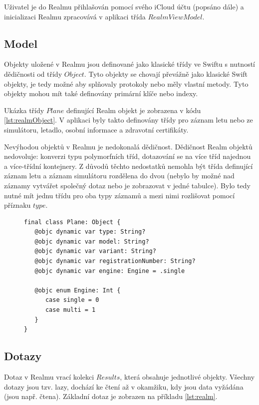 \documentclass[thesis=M,czech]{FITthesis}[2012/06/26]
\begin{document}
Uživatel je do Realmu přihlašován pomocí svého iCloud účtu (popsáno dále) a inicializaci Realmu zpracovává v aplikaci třída $RealmViewModel$.
	
\subsection{Model}
Objekty uložené v Realmu jsou definované jako klasické třídy ve Swiftu s nutností dědičnosti od třídy $Object$. Tyto objekty se chovají převážně jako klasické Swift objekty, je tedy možné aby splňovaly protokoly nebo měly vlastní metody. Tyto objekty mohou mít také definovány primární klíče nebo indexy. 

Ukázka třídy $Plane$ definující Realm objekt je zobrazena v kódu \ref{lst:realmObject}. V aplikaci byly takto definovány třídy pro záznam letu nebo ze simulátoru, letadlo, osobní informace a zdravotní certifikáty.

Nevýhodou objektů v Realmu je nedokonalá dědičnost. Dědičnost Realm objektů nedovoluje: konverzi typu polymorfních tříd, dotazování se na více tříd najednou a více-třídní kontejnery. \cite{realmDocs} Z důvodů těchto nedostatků nemohla být třída definující záznam letu a záznam simulátoru rozdělena do dvou (nebylo by možné nad záznamy vytvářet společný dotaz nebo je zobrazovat v jedné tabulce). Bylo tedy nutné mít jednu třídu pro oba typy záznamů a mezi nimi rozlišovat pomocí příznaku $type$.

\begin{figure}
\begin{minipage}{\linewidth}
\begin{lstlisting}[caption={Ukázka modelu Plane},label={lst:realmObject}]
final class Plane: Object {
   @objc dynamic var type: String?
   @objc dynamic var model: String?
   @objc dynamic var variant: String?
   @objc dynamic var registrationNumber: String?
   @objc dynamic var engine: Engine = .single
    
   @objc enum Engine: Int {
      case single = 0
      case multi = 1
   }
}
\end{lstlisting}
\end{minipage}
\end{figure}

\subsection{Dotazy}
Dotaz v Realmu vrací kolekci $Results$, která obsahuje jednotlivé objekty. Všechny dotazy jsou tzv. lazy, dochází ke čtení až v okamžiku, kdy jsou data vyžádána (jsou např. čtena). \cite{realmDocs} Základní dotaz je zobrazen na příkladu \ref{lst:realm}.
\end{document}
